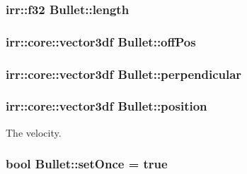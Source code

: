 \hypertarget{class_bullet_a069699cea42b5adef4c794164728b922}{
\subsubsection[{length}]{\setlength{\rightskip}{0pt plus 5cm}irr\-::f32 Bullet\-::length\hspace{0.3cm}{\ttfamily [private]}}}\label{class_bullet_a069699cea42b5adef4c794164728b922}
\hypertarget{class_bullet_a501965fdc9f42f81c85025da2bb57b7e}{
\subsubsection[{off\-Pos}]{\setlength{\rightskip}{0pt plus 5cm}irr\-::core\-::vector3df Bullet\-::off\-Pos\hspace{0.3cm}{\ttfamily [private]}}}\label{class_bullet_a501965fdc9f42f81c85025da2bb57b7e}
\hypertarget{class_bullet_ab856dc3d3abad6d037d33de072474608}{
\subsubsection[{perpendicular}]{\setlength{\rightskip}{0pt plus 5cm}irr\-::core\-::vector3df Bullet\-::perpendicular\hspace{0.3cm}{\ttfamily [private]}}}\label{class_bullet_ab856dc3d3abad6d037d33de072474608}
\hypertarget{class_bullet_a02649f79014e7fa879e619b0404ad22b}{
\subsubsection[{position}]{\setlength{\rightskip}{0pt plus 5cm}irr\-::core\-::vector3df Bullet\-::position\hspace{0.3cm}{\ttfamily [private]}}}\label{class_bullet_a02649f79014e7fa879e619b0404ad22b}


The velocity. 

\hypertarget{class_bullet_aeaf18e3b47ec51f973befce26e97bf48}{
\subsubsection[{set\-Once}]{\setlength{\rightskip}{0pt plus 5cm}bool Bullet\-::set\-Once = true\hspace{0.3cm}{\ttfamily [private]}}}\label{class_bullet_aeaf18e3b47ec51f973befce26e97bf48}


